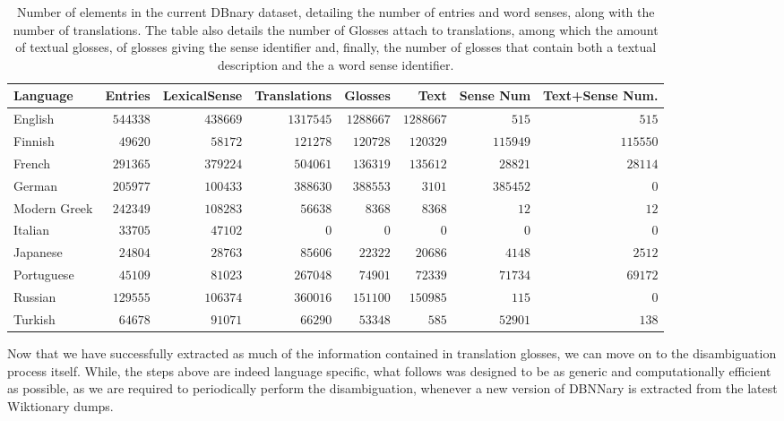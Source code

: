 \documentclass[10pt, a4paper]{article}
\begin{document}
\begin{table}[h]
\begin{center}\begin{footnotesize}
\begin{tabular}{lrrrrrrr}
\textbf{Language} & \textbf{Entries} & \textbf{LexicalSense} & \textbf{Translations} & \textbf{Glosses} & \textbf{Text} &  \textbf{Sense Num} & \textbf{Text+Sense Num.}\\
\hline
English & $544338$ & $438669$ & $1317545$ & $1288667$ & $1288667$ & $515$ & $515$ \\
Finnish & $49620$ & $58172$ & $121278$ & $120728$ & $120329$ & $115949$ & $115550$ \\
French & $291365$ & $379224$ & $504061$ & $136319$ & $135612$ & $28821$ & $28114$ \\
German & $205977$ & $100433$ & $388630$ & $388553$ & $3101$ & $385452$ & $0$ \\
Modern Greek & $242349$ & $108283$ & $56638$ & $8368$ & $8368$ & $12$ & $12$ \\
Italian & $33705$ & $47102$ & $0$ & $0$ & $0$ & $0$ & $0$ \\
Japanese & $24804$ & $28763$ & $85606$ & $22322$ & $20686$ & $4148$ & $2512$ \\
Portuguese & $45109$ & $81023$ & $267048$ & $74901$ & $72339$ & $71734$ & $69172$ \\
Russian & $129555$ & $106374$ & $360016$ & $151100$ & $150985$ & $115$ & $0$ \\
Turkish & $64678$ & $91071$ & $66290$ & $53348$ & $585$ & $52901$ & $138$ \\
\hline
\end{tabular}
\caption{Number of elements in the current DBnary dataset, detailing the number of entries and word senses, along with the number of translations. The table also details the number of Glosses attach to translations, among which the amount of textual glosses, of glosses giving the sense identifier and, finally, the number of glosses that contain both a textual description and the a word sense identifier.}
\label{lemon-elts}
\end{footnotesize}\end{center}

\end{table}

Now that we have successfully extracted as much of the information contained in translation glosses, we can move on to the disambiguation process itself. While, the steps above are indeed language specific, what follows was designed to be as generic and computationally efficient as possible, as we are required to periodically perform the disambiguation, whenever a new version of DBNNary is extracted from the latest Wiktionary dumps.
\end{document}
